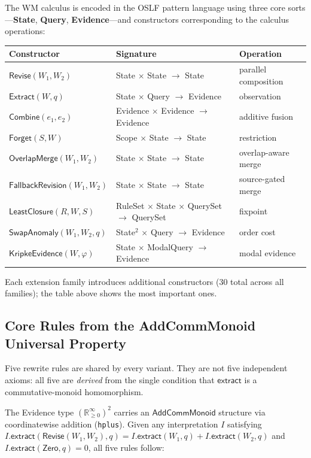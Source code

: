 \documentclass[11pt,openany]{report}
\begin{document}
The WM calculus is encoded in the OSLF pattern language using three core
sorts---\textbf{State}, \textbf{Query}, \textbf{Evidence}---and
constructors corresponding to the calculus operations:

\begin{center}
\begin{tabular}{lll}
\toprule
\textbf{Constructor} & \textbf{Signature} & \textbf{Operation} \\
\midrule
$\mathsf{Revise}(W_1, W_2)$ & State $\times$ State $\to$ State & parallel composition \\
$\mathsf{Extract}(W, q)$ & State $\times$ Query $\to$ Evidence & observation \\
$\mathsf{Combine}(e_1, e_2)$ & Evidence $\times$ Evidence $\to$ Evidence & additive fusion \\
$\mathsf{Forget}(S, W)$ & Scope $\times$ State $\to$ State & restriction \\
$\mathsf{OverlapMerge}(W_1, W_2)$ & State $\times$ State $\to$ State & overlap-aware merge \\
$\mathsf{FallbackRevision}(W_1, W_2)$ & State $\times$ State $\to$ State & source-gated merge \\
$\mathsf{LeastClosure}(R, W, S)$ & RuleSet $\times$ State $\times$ QuerySet $\to$ QuerySet & fixpoint \\
$\mathsf{SwapAnomaly}(W_1, W_2, q)$ & State$^2$ $\times$ Query $\to$ Evidence & order cost \\
$\mathsf{KripkeEvidence}(W, \varphi)$ & State $\times$ ModalQuery $\to$ Evidence & modal evidence \\
\bottomrule
\end{tabular}
\end{center}

Each extension family introduces additional constructors (30 total across
all families); the table above shows the most important ones.

\subsection{Core Rules from the AddCommMonoid Universal Property}
\label{sec:wm-evidence-bridge}

Five rewrite rules are shared by every variant.  They are not five
independent axioms: all five are \emph{derived} from the single condition
that $\mathsf{extract}$ is a commutative-monoid homomorphism.

The Evidence type $(\mathbb{R}_{\ge0}^{\infty})^2$ carries an
$\mathsf{AddCommMonoid}$ structure via coordinatewise addition
(\texttt{hplus}).  Given any interpretation $I$ satisfying
$I.\mathsf{extract}(\mathsf{Revise}(W_1, W_2), q) =
I.\mathsf{extract}(W_1, q) + I.\mathsf{extract}(W_2, q)$ and
$I.\mathsf{extract}(\mathsf{Zero}, q) = 0$, all five rules follow:
\end{document}
